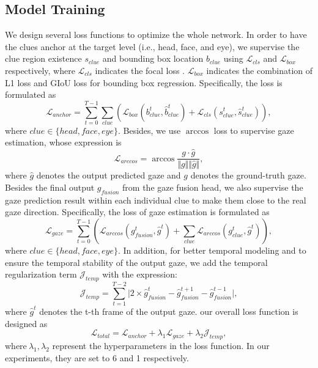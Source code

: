 \documentclass[journal]{IEEEtran}
\begin{document}
\subsection{Model Training}
We design several loss functions to optimize the whole network. In order to have the clues anchor at the target level (i.e., head, face, and eye), we supervise the clue region existence $s_{clue}$ and bounding box location $b_{clue}$ using  $\mathcal{L}_{cls}$ and $\mathcal{L}_{box}$ respectively, where $\mathcal{L}_{cls}$ indicates the focal loss \cite{focalloss}. $\mathcal{L}_{box}$ indicates the combination of L1 loss and GIoU loss \cite{Giou} for bounding box regression. Specifically, the loss  is formulated as
\begin{equation}
    \mathcal{L}_{anchor} = \sum_{t=0}^{T-1}\sum_{clue}(\mathcal{L}_{box}(b^t_{clue},\hat{b}^t_{clue})+\mathcal{L}_{cls}(s^t_{clue},\hat{s}^t_{clue})),
\end{equation}
where $clue \in \{head, face, eye\}$. Besides, we use $\arccos$ loss to supervise gaze estimation, whose expression is
\begin{equation}
    \mathcal{L}_{arccos}=\arccos {\frac{g \cdot \hat{g}}{\Vert g \Vert \Vert \hat{g} \Vert}},
\end{equation} where $\hat{g}$ denotes the output predicted gaze and $g$ denotes the ground-truth gaze. Besides the final output $g_{fusion}$ from the gaze fusion head, we also supervise the gaze prediction result within each individual clue to make them close to the real gaze direction.
Specifically, the loss of gaze estimation is formulated as 
\begin{equation}
    \mathcal{L}_{gaze}=\sum_{t=0}^{T-1}(\mathcal{L}_{arccos}(g_{fusion}^{t},\hat{g}^t)+\sum_{clue}\mathcal{L}_{arccos}(g^t_{clue},\hat{g}^t)),
\end{equation}
where $clue \in \{head, face, eye\}$. In addition, for better temporal modeling and to ensure the temporal stability of the output gaze, we add the temporal regularization term $\mathcal{J}_{temp}$ with the expression:
\begin{equation}
 \mathcal{J}_{temp}=\sum_{t=1}^{T-2}\vert 2\times \hat{g}_{fusion}^{t}-\hat{g}_{fusion}^{t+1}-\hat{g}_{fusion}^{t-1} \vert,  
\end{equation}
where $\hat{g}^{t}$ denotes the t-th frame of the output gaze. our overall loss function is designed as
\begin{equation}
\mathcal{L}_{total}= \mathcal{L}_{anchor}+\lambda_1 \mathcal{L}_{gaze}+\lambda_2 \mathcal{J}_{temp},
\end{equation}
where$\ \lambda_1,\lambda_2$ represent the hyperparameters in the loss function. In our experiments, they are set to 6 and 1 respectively.
\end{document}
